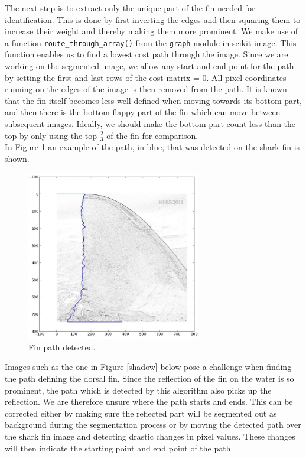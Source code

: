 \documentclass[a4paper,10pt]{article}
\begin{document}
The next step is to extract only the unique part of the fin needed for
identification.   This is done by first inverting the edges and then squaring
them to increase their weight and thereby making them more prominent.  We make use of a function 
\texttt{route\_through\_array()}\cite{scikit} from the \texttt{graph} module in scikit-image.
 This function enables us to find a lowest cost path through the
 image.
Since we are working on the segmented image, we allow any start and end point
for the path by setting the first and last rows of the
  cost matrix = 0.  All
pixel coordinates running on the edges of the image is then removed from the
path.  It is known that the fin itself becomes less well defined when moving towards its bottom part,
and then there is the
  bottom flappy part of the fin which can move between subsequent images.
  Ideally, we should make the bottom part count less than the top by only using the top
$\frac{2}{3}$ of the fin for comparison.\\

In Figure \ref{fin} an example of the path, in blue, that was detected on the shark
fin is shown.
\begin{figure}[H]
 \centering
 \includegraphics[width=3in]{path.jpg}
 \caption{Fin path detected.}
 \label{fin}
\end{figure}

Images such as the one in Figure \ref{shadow} below pose a challenge when finding the path defining the dorsal fin.
Since the reflection of the fin on the water is so prominent, the path which is detected by this algorithm also
picks up the reflection.  We are therefore unsure
where the path starts and ends.  This can be corrected either by
making sure the reflected part will be segmented out as background during the segmentation process or by
moving the detected path over the shark fin image and detecting drastic changes in pixel
values.  These changes will then indicate the starting point and end point of the path.
\end{document}
